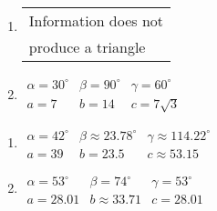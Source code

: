 \begin{multicols}{2} 

\begin{enumerate}

\setcounter{enumi}{\value{HW}}

\item \begin{tabular}{l}
Information does not \\
produce a triangle \end{tabular}

\item $\begin{array}{lll}
\alpha = 30^{\circ} & \beta = 90^{\circ} & \gamma = 60^{\circ} \\
a = 7 & b = 14 & c = 7\sqrt{3} \end{array}$

\setcounter{HW}{\value{enumi}}

\end{enumerate}

\end{multicols}

\begin{multicols}{2} 

\begin{enumerate}

\setcounter{enumi}{\value{HW}}

\item $\begin{array}{lll}
\alpha = 42^{\circ} & \beta \approx 23.78^{\circ} & \gamma \approx 114.22^{\circ} \\
a = 39 & b = 23.5 & c \approx 53.15 \end{array}$

\item $\begin{array}{lll}
\alpha = 53^{\circ} & \beta = 74^{\circ} & \gamma = 53^{\circ} \\
a = 28.01 & b \approx 33.71 & c = 28.01 \end{array}$

\setcounter{HW}{\value{enumi}}

\end{enumerate}

\end{multicols}

